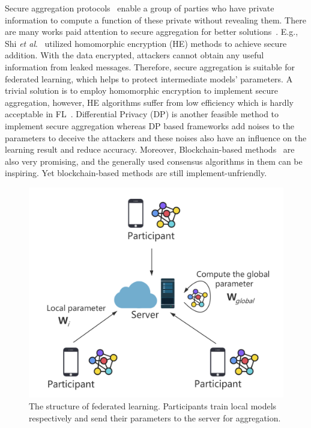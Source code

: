 Secure aggregation protocols~\cite{shi2011privacy} enable a group of parties who have private information to compute a function of these private without revealing them. There are many works paid attention to secure aggregation for better solutions~\cite{shi2011privacy,RobustAgg,Bonawitz19,Nike,PrivFL}. E.g., Shi \emph{et al}.~\cite{shi2011privacy} utilized homomorphic encryption (HE) methods to achieve secure addition. With the data encrypted, attackers cannot obtain any useful information from leaked messages. Therefore, secure aggregation is suitable for federated learning, which helps to protect intermediate models' parameters. A trivial solution is to employ homomorphic encryption to implement secure aggregation, however, HE algorithms suffer from low efficiency which is hardly acceptable in FL~\cite{HESurvey}. Differential Privacy (DP) is another feasible method to implement secure aggregation whereas DP based frameworks add noises to the parameters to deceive the attackers and these noises also have an influence on the learning result and reduce accuracy. Moreover, Blockchain-based methods~\cite{DeepChain,Lu2020,On-Device} are also very promising, and the generally used consensus algorithms in them can be inspiring. Yet blockchain-based methods are still implement-unfriendly. 

\begin{figure}[!ht]
    \centering
    \includegraphics[width=\columnwidth]{img/fed.png}
    \caption{The structure of federated learning. Participants train local models respectively and send their parameters to the server for aggregation.}
    \label{fed}
\end{figure}

